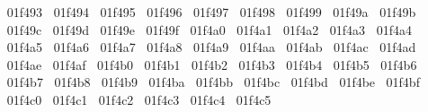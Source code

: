 {  ^^^^^^01f493%
  ^^^^^^01f494%
  ^^^^^^01f495%
  ^^^^^^01f496%
  ^^^^^^01f497%
  ^^^^^^01f498%
  ^^^^^^01f499%
  ^^^^^^01f49a%
  ^^^^^^01f49b%
  ^^^^^^01f49c%
  ^^^^^^01f49d%
  ^^^^^^01f49e%
  ^^^^^^01f49f%
  ^^^^^^01f4a0%
  ^^^^^^01f4a1%
  ^^^^^^01f4a2%
  ^^^^^^01f4a3%
  ^^^^^^01f4a4%
  ^^^^^^01f4a5%
  ^^^^^^01f4a6%
  ^^^^^^01f4a7%
  ^^^^^^01f4a8%
  ^^^^^^01f4a9%
  ^^^^^^01f4aa%
  ^^^^^^01f4ab%
  ^^^^^^01f4ac%
  ^^^^^^01f4ad%
  ^^^^^^01f4ae%
  ^^^^^^01f4af%
  ^^^^^^01f4b0%
  ^^^^^^01f4b1%
  ^^^^^^01f4b2%
  ^^^^^^01f4b3%
  ^^^^^^01f4b4%
  ^^^^^^01f4b5%
  ^^^^^^01f4b6%
  ^^^^^^01f4b7%
  ^^^^^^01f4b8%
  ^^^^^^01f4b9%
  ^^^^^^01f4ba%
  ^^^^^^01f4bb%
  ^^^^^^01f4bc%
  ^^^^^^01f4bd%
  ^^^^^^01f4be%
  ^^^^^^01f4bf%
  ^^^^^^01f4c0%
  ^^^^^^01f4c1%
  ^^^^^^01f4c2%
  ^^^^^^01f4c3%
  ^^^^^^01f4c4%
  ^^^^^^01f4c5%
}
